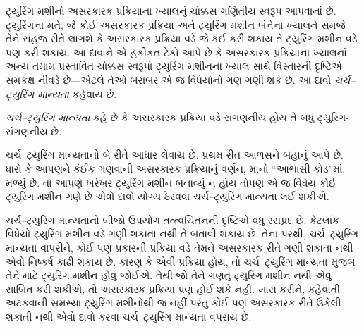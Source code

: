 \documentclass[../../../include/open-logic-section]{subfiles}
\begin{document}

ટ્યુરિંગ મશીનો અસરકારક પ્રક્રિયાના ખ્યાલનું ચોક્કસ
ગણિતીય સ્વરૂપ આપવાનાં છે. ટ્યુરિંગના મતે, જે કોઈ
અસરકારક પ્રક્રિયા અને ટ્યુરિંગ મશીન બંનેના ખ્યાલને
સમજે તેને સહજ રીતે લાગશે કે અસરકારક પ્રક્રિયા વડે
જે કંઈ કરી શકાય તે ટ્યુરિંગ મશીન વડે પણ કરી શકાય.
આ દાવાને એ હકીકત ટેકો આપે છે કે અસરકારક પ્રક્રિયાના
ખ્યાલનાં અન્ય તમામ પ્રસ્તાવિત ચોક્કસ સ્વરૂપો ટ્યુરિંગ
મશીનના ખ્યાલ સાથે વિસ્તારની દૃષ્ટિએ સમકક્ષ નીવડે
છે---એટલે તેઓ બરાબર એ જ વિધેયોનો ગણ ગણી શકે છે.
આ દાવો \emph{ચર્ચ--ટ્યુરિંગ માન્યતા} કહેવાય છે.

\begin{defn}[ચર્ચ--ટ્યુરિંગ માન્યતા]
\emph{ચર્ચ--ટ્યુરિંગ માન્યતા} કહે છે કે અસરકારક
પ્રક્રિયા વડે સંગણનીય હોય તે બધું ટ્યુરિંગ-સંગણનીય છે.
\end{defn}

ચર્ચ--ટ્યુરિંગ માન્યતાનો બે રીતે આધાર લેવાય છે. પ્રથમ
રીત આળસને બહાનું આપે છે. ધારો કે આપણને કંઈક ગણવાની
અસરકારક પ્રક્રિયાનું વર્ણન, માનો ``આભાસી કોડ''માં,
મળ્યું છે. તો આપણે ખરેખર ટ્યુરિંગ મશીન બનાવ્યું ન
હોય તોપણ એ જ વિધેય કોઈ ટ્યુરિંગ મશીન ગણે છે એવો
દાવો યોગ્ય ઠેરવવા ચર્ચ--ટ્યુરિંગ માન્યતા લઈ શકીએ.

ચર્ચ--ટ્યુરિંગ માન્યતાનો બીજો ઉપયોગ તત્ત્વચિંતનની
દૃષ્ટિએ વધુ રસપ્રદ છે. કેટલાંક વિધેયો ટ્યુરિંગ મશીન
વડે ગણી શકાતા નથી તે બતાવી શકાય છે. તેના પરથી,
ચર્ચ--ટ્યુરિંગ માન્યતા વાપરીને, કોઈ પણ પ્રકારની પ્રક્રિયા
વડે તેમને અસરકારક રીતે ગણી શકાતા નથી એવો નિષ્કર્ષ
કાઢી શકાય છે. કારણ કે એવી પ્રક્રિયા હોય, તો
ચર્ચ--ટ્યુરિંગ માન્યતા મુજબ તેને માટે ટ્યુરિંગ મશીન
હોવું જોઈએ. તેથી જો તેને ગણતું ટ્યુરિંગ મશીન નથી
એવું સાબિત કરી શકીએ, તો અસરકારક પ્રક્રિયા પણ
હોઈ શકે નહીં. ખાસ કરીને, કહેવાતી અટકવાની સમસ્યા
ટ્યુરિંગ મશીનોથી જ નહીં પરંતુ કોઈ પણ અસરકારક રીતે
ઉકેલી શકાતી નથી એવો દાવો કરવા ચર્ચ--ટ્યુરિંગ
માન્યતા વપરાય છે.
\end{document}
